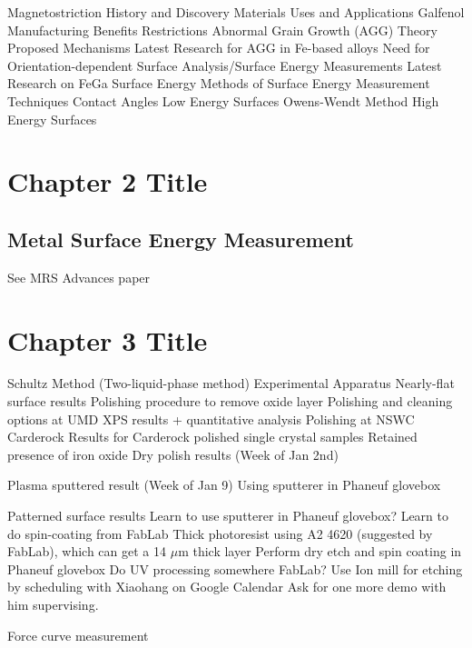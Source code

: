 \documentclass[12pt,letterpaper]{report}
\begin{document}
\begin{outline}[enumerate]
\1 Magnetostriction
	\2 History and Discovery
	\2 Materials
	\2 Uses and Applications
\1 Galfenol
	\2 Manufacturing 
	\2 Benefits
	\2 Restrictions
\1 Abnormal Grain Growth (AGG)
	\2 Theory
	\2 Proposed Mechanisms
	\2 Latest Research for AGG in Fe-based alloys
	\2 Need for Orientation-dependent Surface Analysis/Surface Energy Measurements
		\3 Latest Research on FeGa Surface Energy 
\1 Methods of Surface Energy Measurement Techniques
	\2 Contact Angles
		\3 Low Energy Surfaces
			\4 Owens-Wendt Method
		\3 High Energy Surfaces
		\3 
\end{outline}



\newpage
\chapter{Chapter 2 Title}
\section{Metal Surface Energy Measurement}\label{section2}

\begin{outline}[enumerate]
\1 See MRS Advances paper
	
\end{outline}




\chapter{Chapter 3 Title}

\begin{outline}[enumerate]
\1 Schultz Method (Two-liquid-phase method)
	\2 Experimental Apparatus
\1 Nearly-flat surface results
	\2 Polishing procedure to remove oxide layer
		\3 Polishing and cleaning options at UMD
			\4 XPS results + quantitative analysis
		\3 Polishing at NSWC Carderock
	\2 Results for Carderock polished single crystal samples
		\3 Retained presence of iron oxide
	\2 Dry polish results (Week of Jan 2nd)
	
	\2 Plasma sputtered result (Week of Jan 9)
		\3 Using sputterer in Phaneuf glovebox
		
\1 Patterned surface results
	\2 Learn to use sputterer in Phaneuf glovebox?
	\2 Learn to do spin-coating from FabLab
		\3 Thick photoresist using A2 4620 (suggested by FabLab), which can get a 14 $\mu$m thick layer
	\2 Perform dry etch and spin coating in Phaneuf glovebox
	\2 Do UV processing somewhere
		\3 FabLab?
	\2 Use Ion mill for etching by scheduling with Xiaohang on Google Calendar
		\3 Ask for one more demo with him supervising. 
	
\1 Force curve measurement
	
	
	
\end{outline}
\end{document}

